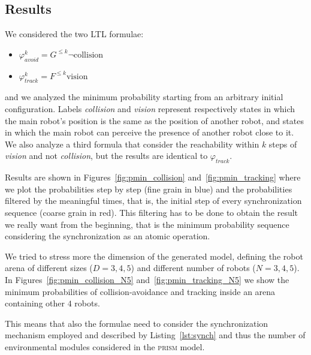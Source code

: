 \documentclass{article}
\newcommand{\PRISM}{\textsc{prism}}
\begin{document}
\subsection*{Results} %
\label{sub:results}

% 
We considered the two LTL formulae:
\begin{itemize}
	\item $\varphi_{avoid}^k = G^{\leq k} \neg \text{collision}$
	\item $\varphi_{track}^k = F^{\leq k} \text{vision}$
\end{itemize}
and we analyzed the minimum probability starting from an arbitrary initial configuration. Labels \textit{collision} and \textit{vision} represent respectively states in which the main robot's position is the same as the position of another robot, and states in which the main robot can perceive the presence of another robot close to it. We also analyze a third formula that consider the reachability within $k$ steps of \textit{vision} and not \textit{collision}, but the results are identical to $\varphi_{track}$.

Results are shown in Figures~\ref{fig:pmin_collision} and~\ref{fig:pmin_tracking} where we plot the probabilities step by step (fine grain in blue) and the probabilities filtered by the meaningful times, that is, the initial step of every synchronization sequence (coarse grain in red). This filtering has to be done to obtain the result we really want from the beginning, that is the minimum probability sequence considering the synchronization as an atomic operation.

We tried to stress more the dimension of the generated model, defining the robot arena of different sizes ($D = 3,4,5$) and different number of robots ($N = 3,4,5$). In Figures~\ref{fig:pmin_collision_N5} and~\ref{fig:pmin_tracking_N5} we show the minimum probabilities of collision-avoidance and tracking inside an arena containing other $4$ robots.

This means that also the formulae need to consider the synchronization mechanism employed and described by Listing~\ref{lst:synch} and thus the number of environmental modules considered in the \PRISM{} model.
\end{document}
